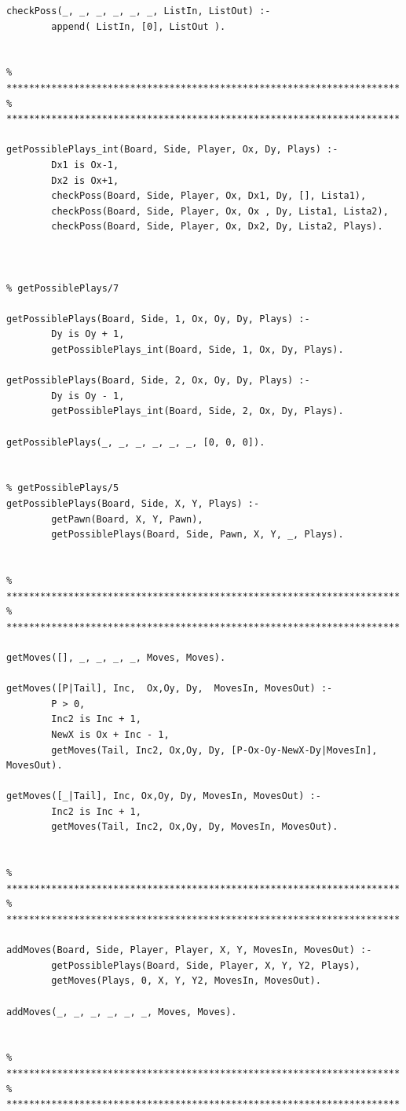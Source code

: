 \documentclass[15pt,a4paper]{article}
\begin{document}
\begin{lstlisting}
checkPoss(_, _, _, _, _, _, ListIn, ListOut) :-
		append( ListIn, [0], ListOut ).
		

% **********************************************************************
% **********************************************************************    
		
getPossiblePlays_int(Board, Side, Player, Ox, Dy, Plays) :-
		Dx1 is Ox-1,
		Dx2 is Ox+1,
		checkPoss(Board, Side, Player, Ox, Dx1, Dy, [], Lista1),
		checkPoss(Board, Side, Player, Ox, Ox , Dy, Lista1, Lista2),
		checkPoss(Board, Side, Player, Ox, Dx2, Dy, Lista2, Plays).

		
		
% getPossiblePlays/7		

getPossiblePlays(Board, Side, 1, Ox, Oy, Dy, Plays) :-
		Dy is Oy + 1,
		getPossiblePlays_int(Board, Side, 1, Ox, Dy, Plays).
		
getPossiblePlays(Board, Side, 2, Ox, Oy, Dy, Plays) :-
		Dy is Oy - 1,
		getPossiblePlays_int(Board, Side, 2, Ox, Dy, Plays).
		
getPossiblePlays(_, _, _, _, _, _, [0, 0, 0]).
		

% getPossiblePlays/5
getPossiblePlays(Board, Side, X, Y, Plays) :-
		getPawn(Board, X, Y, Pawn),
		getPossiblePlays(Board, Side, Pawn, X, Y, _, Plays).
		

% **********************************************************************
% **********************************************************************

getMoves([], _, _, _, _, Moves, Moves).

getMoves([P|Tail], Inc,  Ox,Oy, Dy,  MovesIn, MovesOut) :-
		P > 0,
		Inc2 is Inc + 1,
		NewX is Ox + Inc - 1,
		getMoves(Tail, Inc2, Ox,Oy, Dy, [P-Ox-Oy-NewX-Dy|MovesIn], MovesOut).			

getMoves([_|Tail], Inc, Ox,Oy, Dy, MovesIn, MovesOut) :-
		Inc2 is Inc + 1,
		getMoves(Tail, Inc2, Ox,Oy, Dy, MovesIn, MovesOut).
		
		
% **********************************************************************
% **********************************************************************
	
addMoves(Board, Side, Player, Player, X, Y, MovesIn, MovesOut) :-
		getPossiblePlays(Board, Side, Player, X, Y, Y2, Plays),
		getMoves(Plays, 0, X, Y, Y2, MovesIn, MovesOut).

addMoves(_, _, _, _, _, _, Moves, Moves).		


% **********************************************************************
% **********************************************************************


\end{lstlisting}
\end{document}
